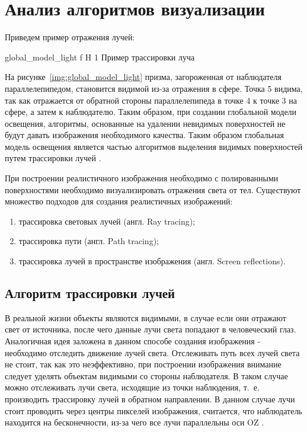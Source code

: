 \section{Анализ алгоритмов визуализации}

Приведем пример отражения лучей:



{global_model_light} %
{f} %
{H} %
{1\textwidth} %
{Пример трассировки луча} %



На рисунке~\ref{img:global_model_light}  призма, загороженная от наблюдателя параллелепипедом, становится видимой из-за отражения в сфере.
Точка 5 видима, так как отражается от обратной стороны параллелепипеда в точке 4 к точке 3 на сфере, а затем к наблюдателю.
Таким образом, при создании глобальной модели освещения, алгоритмы, основанные на удалении невидимых поверхностей не будут давать изображения необходимого качества.
Таким образом глобальная модель освещения является частью алгоритмов выделения видимых поверхностей путем трассировки лучей \cite{Rodgers}.


При построении реалистичного изображения необходимо с полированными поверхностями необходимо визуализировать отражения света от тел.
Существуют множество подходов для создания реалистичных изображений:
\begin{enumerate}
	\item трассировка световых лучей (англ. Ray tracing);
	\item трассировка пути (англ. Path  tracing);
	\item трассировка лучей в пространстве изображения (англ. Screen reflections).
\end{enumerate}





\subsection{Алгоритм трассировки лучей}
\label{sec:ray_tracing}
В реальной жизни объекты являются видимыми, в случае если они отражают свет от источника, после чего данные лучи света попадают в человеческий глаз. Аналогичная идея заложена в данном способе создания изображения - необходимо отследить движение лучей света.
Отслеживать путь всех лучей света не стоит, так как это неэффективно, при построении изображения внимание следует уделять объектам видимыми со стороны наблюдателя.
В таком случае можно отслеживать лучи света, исходящие из точки наблюдения, т.~е. производить трассировку лучей в обратном направлении. В данном случае лучи стоит проводить через центры пикселей изображения,
считается, что наблюдатель находится на бесконечности, из-за чего все лучи параллельны оси OZ \cite{Rodgers,modern_ray_tracing}.




